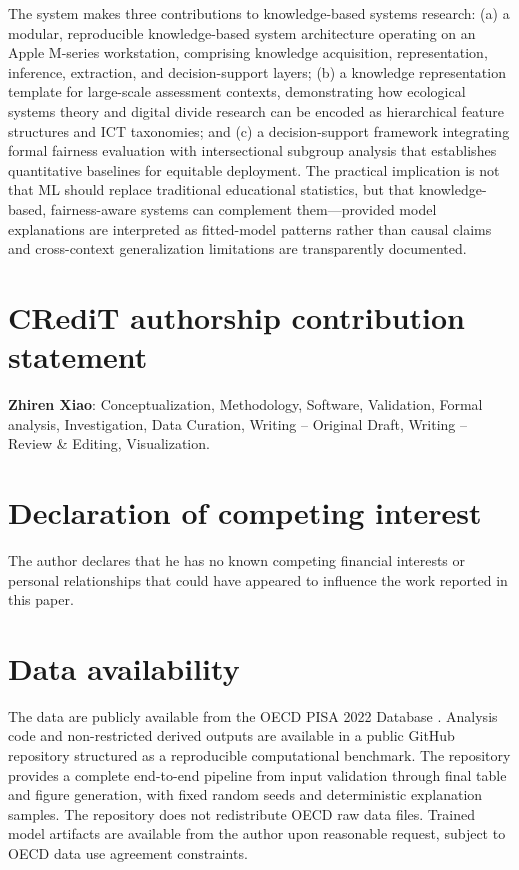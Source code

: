 \documentclass[review,12pt]{elsarticle}
\begin{document}
The system makes three contributions to knowledge-based systems research: (a) a modular, reproducible knowledge-based system architecture operating on an Apple M-series workstation, comprising knowledge acquisition, representation, inference, extraction, and decision-support layers; (b) a knowledge representation template for large-scale assessment contexts, demonstrating how ecological systems theory and digital divide research can be encoded as hierarchical feature structures and ICT taxonomies; and (c) a decision-support framework integrating formal fairness evaluation with intersectional subgroup analysis that establishes quantitative baselines for equitable deployment. The practical implication is not that ML should replace traditional educational statistics, but that knowledge-based, fairness-aware systems can complement them---provided model explanations are interpreted as fitted-model patterns rather than causal claims and cross-context generalization limitations are transparently documented.


\FloatBarrier

\section*{CRediT authorship contribution statement}

\textbf{Zhiren Xiao}: Conceptualization, Methodology, Software, Validation, Formal analysis, Investigation, Data Curation, Writing -- Original Draft, Writing -- Review \& Editing, Visualization.

\section*{Declaration of competing interest}

The author declares that he has no known competing financial interests or personal relationships that could have appeared to influence the work reported in this paper.

\section*{Data availability}

The data are publicly available from the OECD PISA 2022 Database \citep{OECD_2022_database}. Analysis code and non-restricted derived outputs are available in a public GitHub repository structured as a reproducible computational benchmark. The repository provides a complete end-to-end pipeline from input validation through final table and figure generation, with fixed random seeds and deterministic explanation samples. The repository does not redistribute OECD raw data files. Trained model artifacts are available from the author upon reasonable request, subject to OECD data use agreement constraints.
\end{document}
